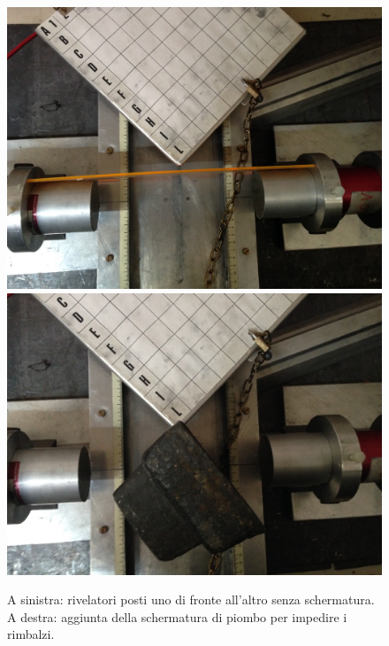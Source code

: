 \begin{figure}[h]
\centering
\subfloat
{\includegraphics[width=17 em]{immagini/alter} \label{spostati} }
\subfloat
{\includegraphics[width=17 em]{immagini/spostati2} \label{spostati2}}
\caption{A sinistra: rivelatori posti uno di fronte all'altro senza schermatura. A destra: aggiunta della schermatura di piombo per impedire i rimbalzi.}
\end{figure}

